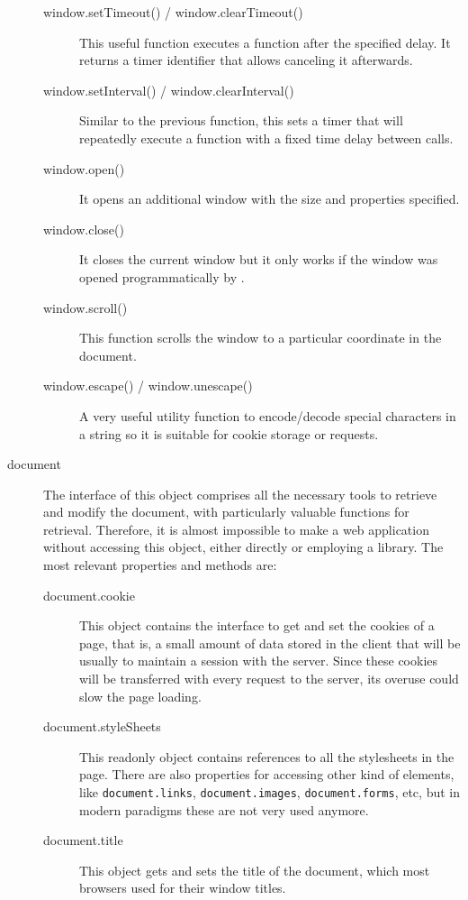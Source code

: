\begin{description}
\begin{description}
    \item[window.setTimeout() / window.clearTimeout()] This useful function executes a function after the specified delay.
    It returns a timer identifier that allows canceling it afterwards.
    \item[window.setInterval() / window.clearInterval()] Similar to the previous function, this sets a timer that will repeatedly execute a function with a fixed time delay between calls.
    \item[window.open()] It opens an additional window with the size and properties specified.
    \item[window.close()] It closes the current window but it only works if the window was opened programmatically by .
    \item[window.scroll()] This function scrolls the window to a particular coordinate in the document.
    \item[window.escape() / window.unescape()] A very useful utility function to encode/decode special characters in a string so it is suitable for cookie storage or  requests.
  \end{description}
  \item[document] The interface of this object comprises all the necessary tools to retrieve and modify the document, with particularly valuable functions for  retrieval.
  Therefore, it is almost impossible to make a web application without accessing this object, either directly or employing a  library.
  The most relevant properties and methods are:
  \begin{description}
    \item[document.cookie] This object contains the interface to get and set the cookies of a page, that is, a small amount of data stored in the client that will be usually to maintain a session with the server.
    Since these cookies will be transferred with every request to the server, its overuse could slow the page loading.
    \item[document.styleSheets] This readonly object contains references to all the stylesheets in the page.
    There are also properties for accessing other kind of elements, like \texttt{document.links}, \texttt{document.images}, \texttt{document.forms}, etc, but in modern  paradigms these are not very used anymore.
    \item[document.title] This object gets and sets the title of the document, which most browsers used for their window titles.

\end{description}
\end{description}
